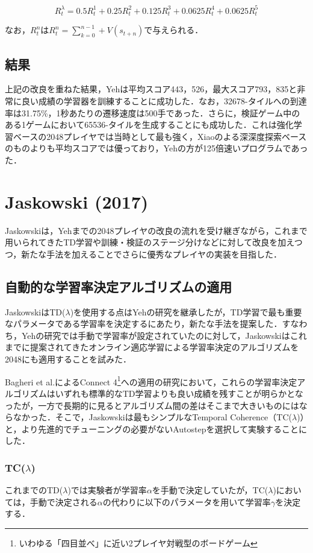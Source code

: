 \documentclass{suribt}
\begin{document}
\[
R^{\lambda}_t = 0.5R^1_t + 0.25R^2_t + 0.125R^3_t + 0.0625R^4_t + 0.0625R^5_t
\]

なお，$R^n_t$は$R^n_t = \sum_{k=0}^{n-1} + V(s_{t+n})$で与えられる．

\subsection{結果}
上記の改良を重ねた結果，Yehは平均スコア443，526，最大スコア793，835と非常に良い成績の学習器を訓練することに成功した．なお，32678-タイルへの到達率は31.75\%，1秒あたりの遷移速度は500手であった．さらに，検証ゲーム中のある1ゲームにおいて65536-タイルを生成することにも成功した．これは強化学習ベースの2048プレイヤでは当時として最も強く，Xiaoのよる深深度探索ベースのものよりも平均スコアでは優っており，Yehの方が125倍速いプログラムであった．

\section{Jaskowski (2017)}
Jaskowskiは，Yehまでの2048プレイヤの改良の流れを受け継ぎながら，これまで用いられてきたTD学習や訓練・検証のステージ分けなどに対して改良を加えつつ，新たな手法を加えることでさらに優秀なプレイヤの実装を目指した．

\subsection{自動的な学習率決定アルゴリズムの適用}
JaskowskiはTD(${\lambda}$)を使用する点はYehの研究を継承したが，TD学習で最も重要なパラメータである学習率を決定するにあたり，新たな手法を提案した．すなわち，Yehの研究では手動で学習率が設定されていたのに対して，Jaskowskiはこれまでに提案されてきたオンライン適応学習による学習率決定のアルゴリズムを2048にも適用することを試みた．

Bagheri et al.によるConnect 4\footnote{いわゆる「四目並べ」に近い2プレイヤ対戦型のボードゲーム}への適用の研究において，これらの学習率決定アルゴリズムはいずれも標準的なTD学習よりも良い成績を残すことが明らかとなったが\cite{Bagheri}，一方で長期的に見るとアルゴリズム間の差はそこまで大きいものにはならなかった．そこで，Jaskowskiは最もシンプルなTemporal Coherence（TC(${\lambda}$)）と，より先進的でチューニングの必要がないAutostepを選択して実験することにした．

\subsubsection{TC(${\lambda}$)}
これまでのTD(${\lambda}$)では実験者が学習率${\alpha}$を手動で決定していたが，TC(${\lambda}$)においては，手動で決定される${\alpha}$の代わりに以下のパラメータを用いて学習率${\gamma}$を決定する．
\end{document}
